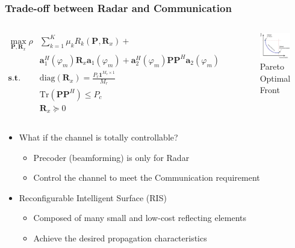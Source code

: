 \documentclass[9pt]{beamer}
\begin{document}
\begin{frame}
\frametitle{Trade-off between Radar and Communication}

\begin{columns}[c]
\begin{align*}
  \max_{\mathbf{P},\mathbf{R}_x} \rho&\sum_{k=1}^K \mu_k R_k(\mathbf{P},\mathbf{R}_x) + \\
  &\mathbf{a}_1^H(\varphi_m)\mathbf{R}_x \mathbf{a}_1(\varphi_m) + \mathbf{a}_2^H(\varphi_m)\mathbf{P}\mathbf{P}^H\mathbf{a}_2(\varphi_m)\\
  \mathbf{s.t.} \quad  &\mathrm{diag}(\mathbf{R}_x) = \frac{P_r \mathbf{1}^{M_r \times 1}}{M_r} \\ 
  &\mathrm{Tr} (\mathbf{P}\mathbf{P}^H) \leq P_c \\
  &\mathbf{R}_x \succeq 0 
\end{align*}

\begin{figure}
  \includegraphics[width=0.9\linewidth]{Fig2.png}
  \caption{Pareto Optimal Front}
\end{figure}
\end{columns}

\begin{itemize}
  \item What if the channel is totally controllable?
  \begin{itemize}
    \item Precoder (beamforming) is only for Radar
    \item Control the channel to meet the Communication requirement
  \end{itemize}

  \item Reconfigurable Intelligent Surface (RIS) 
  \begin{itemize}
    \item Composed of many small and low-cost reflecting elements
    \item Achieve the desired propagation characteristics 
  \end{itemize}
\end{itemize}
\end{frame}
\end{document}
